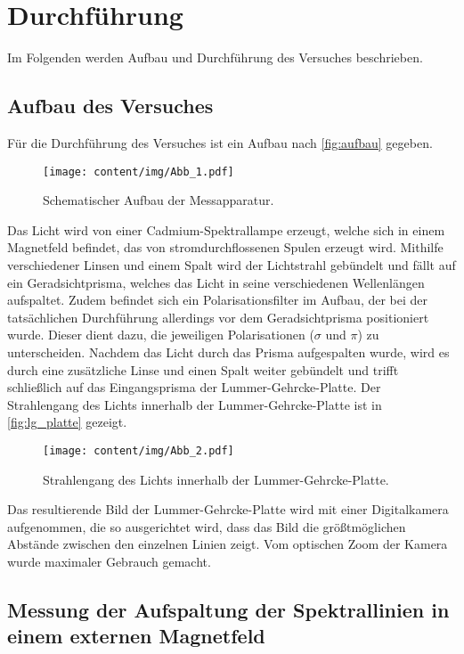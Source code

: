 \section{Durchführung}
\label{sec:durchfuehrung}
Im Folgenden werden Aufbau und Durchführung des Versuches beschrieben.


\subsection{Aufbau des Versuches}

Für die Durchführung des Versuches ist ein Aufbau nach \autoref{fig:aufbau} gegeben.
\begin{figure}[H]
    \centering
    \texttt{[image: content/img/Abb\_1.pdf]}
    \caption{Schematischer Aufbau der Messapparatur. \cite{versuchsanleitung}}
    \label{fig:aufbau}
\end{figure}

Das Licht wird von einer Cadmium-Spektrallampe erzeugt,
welche sich in einem Magnetfeld befindet,
das von stromdurchflossenen Spulen erzeugt wird.
Mithilfe verschiedener Linsen und einem Spalt wird der Lichtstrahl gebündelt und fällt auf ein Geradsichtprisma,
welches das Licht in seine verschiedenen Wellenlängen aufspaltet.
Zudem befindet sich ein Polarisationsfilter im Aufbau,
der bei der tatsächlichen Durchführung allerdings vor dem Geradsichtprisma positioniert wurde.
Dieser dient dazu,
die jeweiligen Polarisationen ($\sigma$ und $\pi$) zu unterscheiden.
Nachdem das Licht durch das Prisma aufgespalten wurde,
wird es durch eine zusätzliche Linse und einen Spalt weiter gebündelt und trifft schließlich auf das Eingangsprisma der Lummer-Gehrcke-Platte.
Der Strahlengang des Lichts innerhalb der Lummer-Gehrcke-Platte ist in \autoref{fig:lg_platte} gezeigt.
\begin{figure}[H]
    \centering
    \texttt{[image: content/img/Abb\_2.pdf]}
    \caption{Strahlengang des Lichts innerhalb der Lummer-Gehrcke-Platte. \cite{versuchsanleitung}}
    \label{fig:lg_platte}
\end{figure}
Das resultierende Bild der Lummer-Gehrcke-Platte wird mit einer Digitalkamera aufgenommen,
die so ausgerichtet wird,
dass das Bild die größtmöglichen Abstände zwischen den einzelnen Linien zeigt.
Vom optischen Zoom der Kamera wurde maximaler Gebrauch gemacht.


\subsection{Messung der Aufspaltung der Spektrallinien in einem externen Magnetfeld}

